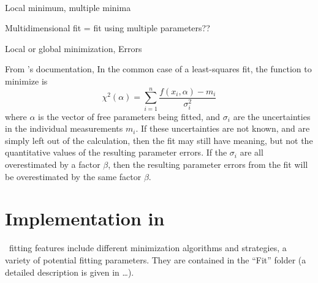 \\


Local minimum, multiple minima

Multidimensional fit = fit using multiple parameters??

Local or global minimization, Errors


From 's documentation, In the common case of a least-squares
fit, the function to minimize is 
\begin{equation*}
\chi^2(\alpha)=\sum_{i=1}^n \frac{f(x_i,\alpha)-m_i}{\sigma_i^2}
\end{equation*}
where $\alpha$ is the vector of free parameters being fitted, and
$\sigma_i$ are the uncertainties in the individual measurements
$m_i$. If these uncertainties are not known, and are simply left out
of the calculation, then the fit may still have meaning, but not the
quantitative values of the resulting parameter errors. If the
$\sigma_i$ are all overestimated by a factor $\beta$, then the
resulting parameter errors from the fit will be overestimated by the
same factor $\beta$.




\section{Implementation in \BornAgain}
\BornAgain\ fitting features include different minimization
algorithms and strategies, a variety of potential fitting parameters. They are contained
in the ``Fit'' folder (a detailed description is given in \ldots). 

